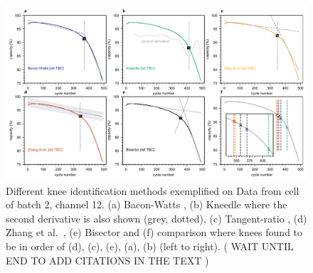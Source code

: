 \documentclass{article}
\newcommand{\cmark}{\textcolor{blue}{\textrm{\ding{52}}}}%
\begin{document}



\begin{figure}[h!tb]
\centering
\includegraphics[width=\textwidth]{images/knee_identification_methods.pdf}
\caption{Different knee identification methods exemplified on Data from \cite{severson_data-driven_2019} cell of batch 2, channel 12. (a) Bacon-Watts \cite{fermin-cueto_identification_2020}, (b) Kneedle \cite{satopaa_finding_2011} where the second derivative is also shown (grey, dotted), (c) Tangent-ratio \cite{diao_algorithm_2019}, (d) Zhang et al.~\cite{zhang_identifying_2020}, (e) Bisector and (f) comparison where knees found to be in order  of (d), (c), (e), (a), (b) (left to right). 
(
WAIT UNTIL END TO ADD CITATIONS IN THE TEXT )}
\label{fig:knee_identification_methods}
\end{figure}
\end{document}
